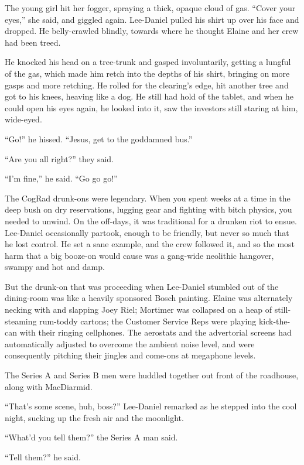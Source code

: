 The young girl hit her fogger, spraying a thick, opaque cloud of gas. 
“Cover your eyes,” she said, and giggled again. Lee-Daniel pulled 
his shirt up over his face and dropped. He belly-crawled blindly, 
towards where he thought Elaine and her crew had been treed.

He knocked his head on a tree-trunk and gasped involuntarily, getting a 
lungful of the gas, which made him retch into the depths of his shirt, 
bringing on more gasps and more retching. He rolled for the clearing's 
edge, hit another tree and got to his knees, heaving like a dog. He 
still had hold of the tablet, and when he could open his eyes again, he 
looked into it, saw the investors still staring at him, wide-eyed.

“Go!” he hissed. “Jesus, get to the goddamned bus.”

“Are you all right?” they said.

“I'm fine,” he said. “Go go go!”

\tb

The CogRad drunk-ons were legendary. When you spent weeks at a time in 
the deep bush on dry reservations, lugging gear and fighting with bitch 
physics, you needed to unwind. On the off-days, it was traditional for 
a drunken riot to ensue. Lee-Daniel occasionally partook, enough to be 
friendly, but never so much that he lost control. He set a sane 
example, and the crew followed it, and so the most harm that a big 
booze-on would cause was a gang-wide neolithic hangover, swampy and hot 
and damp.

But the drunk-on that was proceeding when Lee-Daniel stumbled out of 
the dining-room was like a heavily sponsored Bosch painting. Elaine was 
alternately necking with and slapping Joey Riel; Mortimer was collapsed 
on a heap of still-steaming rum-toddy cartons; the Customer Service 
Reps were playing kick-the-can with their ringing cellphones. The 
aerostats and the advertorial screens had automatically adjusted to 
overcome the ambient noise level, and were consequently pitching their 
jingles and come-ons at megaphone levels.

The Series A and Series B men were huddled together out front of the 
roadhouse, along with MacDiarmid.

“That's some scene, huh, boss?” Lee-Daniel remarked as he stepped 
into the cool night, sucking up the fresh air and the moonlight.

“What'd you tell them?” the Series A man said.

“Tell them?” he said.

